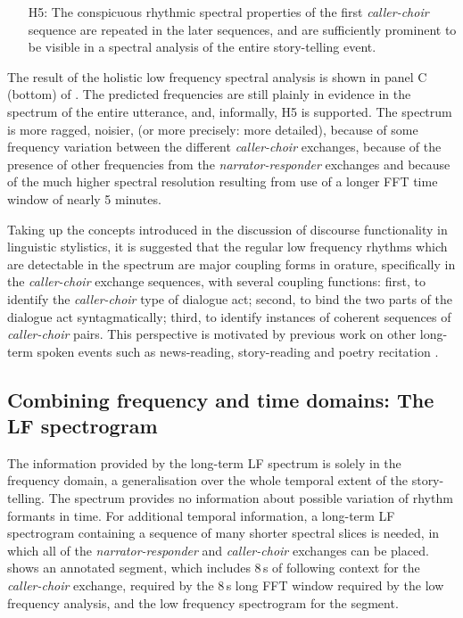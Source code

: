 \documentclass[output=paper,colorlinks,citecolor=brown]{langscibook}
\begin{document}
\begin{itemize}
    \item[H5:] The conspicuous rhythmic spectral properties of the first \textit{caller-choir} sequence are repeated in the later sequences, and are sufficiently prominent to be visible in a spectral analysis of the entire story-telling event.
\end{itemize}

The result of the holistic low frequency spectral analysis is shown in panel C (bottom) of . The predicted frequencies are still plainly in evidence in the spectrum of the entire utterance, and, informally, H5 is supported. The spectrum is more ragged, noisier, (or more precisely: more detailed), because of some frequency variation between the different \textit{caller-choir} exchanges, because of the presence of other frequencies from the \textit{narrator-responder} exchanges and because of the much higher spectral resolution resulting from use of a longer FFT time window of nearly 5 minutes.

Taking up the concepts introduced in the discussion of discourse functionality in linguistic stylistics, it is suggested that the regular low frequency rhythms which are detectable in the spectrum are major coupling forms in orature, specifically in the \textit{caller-choir} exchange sequences, with several coupling functions: first, to identify the \textit{caller-choir} type of dialogue act; second, to bind the two parts of the dialogue act syntagmatically; third, to identify instances of coherent sequences of \textit{caller-choir} pairs. This perspective is motivated by previous work on other long-term spoken events such as news-reading, story-reading and poetry recitation \citep{gibbonjipa2021, gibbon4urua2022, gibbonsp2022}.

\subsection{Combining frequency and time domains: The LF spectrogram}

The information provided by the long-term LF spectrum is solely in the frequency domain, a generalisation over the whole temporal extent of the story-telling. The spectrum provides no information about possible variation of rhythm formants in time. For additional temporal information, a long-term LF spectrogram containing a sequence of many shorter spectral slices is needed, in which all of the \textit{narrator-responder} and \textit{caller-choir} exchanges can be placed.  shows an annotated segment, which includes 8\,s of following context for the \textit{caller-choir} exchange, required by the 8\,s long FFT window required by the low frequency analysis, and the low frequency spectrogram for the segment.
\end{document}
